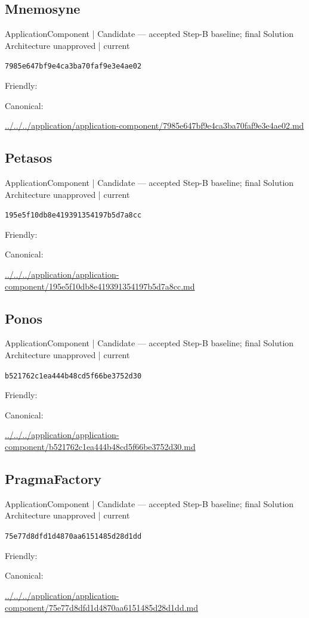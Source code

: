 \documentclass[10pt,a4paper]{article}
\begin{document}
\subsection*{Mnemosyne}
{\small ApplicationComponent | Candidate — accepted Step-B baseline; final Solution Architecture unapproved | current}\par
\texttt{7985e647bf9e4ca3ba70faf9e3e4ae02}\par
Friendly: \par
Canonical: \par
{\footnotesize\url{../../../application/application-component/7985e647bf9e4ca3ba70faf9e3e4ae02.md}}\par
\subsection*{Petasos}
{\small ApplicationComponent | Candidate — accepted Step-B baseline; final Solution Architecture unapproved | current}\par
\texttt{195e5f10db8e419391354197b5d7a8cc}\par
Friendly: \par
Canonical: \par
{\footnotesize\url{../../../application/application-component/195e5f10db8e419391354197b5d7a8cc.md}}\par
\subsection*{Ponos}
{\small ApplicationComponent | Candidate — accepted Step-B baseline; final Solution Architecture unapproved | current}\par
\texttt{b521762c1ea444b48cd5f66be3752d30}\par
Friendly: \par
Canonical: \par
{\footnotesize\url{../../../application/application-component/b521762c1ea444b48cd5f66be3752d30.md}}\par
\subsection*{PragmaFactory}
{\small ApplicationComponent | Candidate — accepted Step-B baseline; final Solution Architecture unapproved | current}\par
\texttt{75e77d8dfd1d4870aa6151485d28d1dd}\par
Friendly: \par
Canonical: \par
{\footnotesize\url{../../../application/application-component/75e77d8dfd1d4870aa6151485d28d1dd.md}}\par
\end{document}
